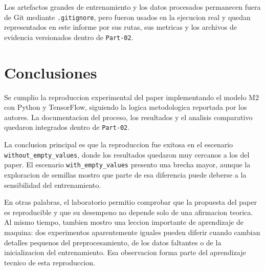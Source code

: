 \documentclass[11pt,a4paper]{article}
\begin{document}
Los artefactos grandes de entrenamiento y los datos procesados permanecen fuera de Git mediante \texttt{.gitignore}, pero fueron usados en la ejecucion real y quedan representados en este informe por sus rutas, sus metricas y los archivos de evidencia versionados dentro de \texttt{Part-02}.

\section{Conclusiones}
Se cumplio la reproduccion experimental del paper implementando el modelo M2 con Python y TensorFlow, siguiendo la logica metodologica reportada por los autores. La documentacion del proceso, los resultados y el analisis comparativo quedaron integrados dentro de \texttt{Part-02}.

La conclusion principal es que la reproduccion fue exitosa en el escenario \texttt{without\_empty\_values}, donde los resultados quedaron muy cercanos a los del paper. El escenario \texttt{with\_empty\_values} presento una brecha mayor, aunque la exploracion de semillas mostro que parte de esa diferencia puede deberse a la sensibilidad del entrenamiento.

En otras palabras, el laboratorio permitio comprobar que la propuesta del paper es reproducible y que su desempeno no depende solo de una afirmacion teorica. Al mismo tiempo, tambien mostro una leccion importante de aprendizaje de maquina: dos experimentos aparentemente iguales pueden diferir cuando cambian detalles pequenos del preprocesamiento, de los datos faltantes o de la inicializacion del entrenamiento. Esa observacion forma parte del aprendizaje tecnico de esta reproduccion.
\end{document}

